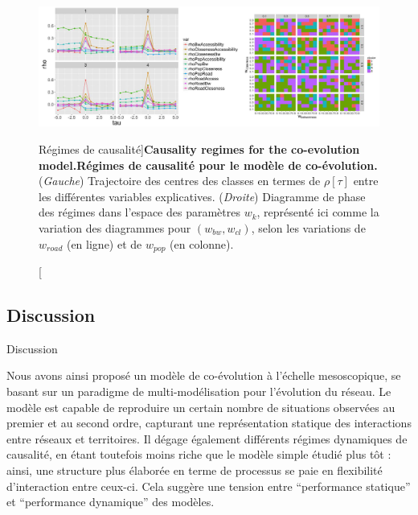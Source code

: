 \begin{figure}
	\includegraphics[width=\linewidth]{Figures/Final/7-2-2-fig-mesocoevolmodel-causality}
	\caption[Causality regimes][Régimes de causalité]{\textbf{Causality regimes for the co-evolution model.}\label{fig:mesocoevolmodel:causality}}{\textbf{Régimes de causalité pour le modèle de co-évolution.} (\textit{Gauche}) Trajectoire des centres des classes en termes de $\rho[\tau]$ entre les différentes variables explicatives. (\textit{Droite}) Diagramme de phase des régimes dans l'espace des paramètres $w_k$, représenté ici comme la variation des diagrammes pour $(w_{bw},w_{cl})$, selon les variations de $w_{road}$ (en ligne) et de $w_{pop}$ (en colonne). \label{fig:mesocoevolmodel:causality}}
\end{figure}





\subsection{Discussion}{Discussion}


Nous avons ainsi proposé un modèle de co-évolution à l'échelle mesoscopique, se basant sur un paradigme de multi-modélisation pour l'évolution du réseau. Le modèle est capable de reproduire un certain nombre de situations observées au premier et au second ordre, capturant une représentation statique des interactions entre réseaux et territoires. Il dégage également différents régimes dynamiques de causalité, en étant toutefois moins riche que le modèle simple étudié plus tôt : ainsi, une structure plus élaborée en terme de processus se paie en flexibilité d'interaction entre ceux-ci. Cela suggère une tension entre ``performance statique'' et ``performance dynamique'' des modèles.


